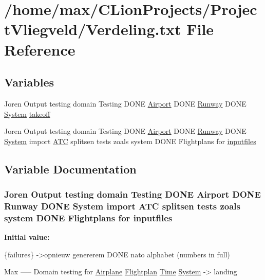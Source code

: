 \hypertarget{Verdeling_8txt}{}\section{/home/max/\+C\+Lion\+Projects/\+Project\+Vliegveld/\+Verdeling.txt File Reference}
\label{Verdeling_8txt}
\subsection*{Variables}
\begin{DoxyCompactItemize}
\item 
Joren Output testing domain Testing D\+O\+NE \hyperlink{classAirport}{Airport} D\+O\+NE \hyperlink{classRunway}{Runway} D\+O\+NE \hyperlink{classSystem}{System} \hyperlink{Verdeling_8txt_a79276dc93193eff1d7f9ab69fa134955}{takeoff}
\item 
Joren Output testing domain Testing D\+O\+NE \hyperlink{classAirport}{Airport} D\+O\+NE \hyperlink{classRunway}{Runway} D\+O\+NE \hyperlink{classSystem}{System} import \hyperlink{classATC}{A\+TC} splitsen tests zoals system D\+O\+NE Flightplans for \hyperlink{Verdeling_8txt_aed5addfe3e719c6d6cb3f85c69ea1b68}{inputfiles}
\end{DoxyCompactItemize}


\subsection{Variable Documentation}
\subsubsection[{\texorpdfstring{inputfiles}{inputfiles}}]{\setlength{\rightskip}{0pt plus 5cm}Joren Output testing domain Testing D\+O\+NE {\bf Airport} D\+O\+NE {\bf Runway} D\+O\+NE {\bf System} import {\bf A\+TC} splitsen tests zoals system D\+O\+NE Flightplans for inputfiles}\hypertarget{Verdeling_8txt_aed5addfe3e719c6d6cb3f85c69ea1b68}{}\label{Verdeling_8txt_aed5addfe3e719c6d6cb3f85c69ea1b68}
{\bfseries Initial value\+:}
\begin{DoxyCode}
\{failures\}
            ->opnieuw genererem
DONE    nato alphabet (numbers in full)


Max
-----
Domain testing \textcolor{keywordflow}{for}
\hyperlink{classAirplane}{Airplane}
\hyperlink{classFlightplan}{Flightplan}
\hyperlink{classTime}{Time}
\hyperlink{classSystem}{System} -> landing
\end{DoxyCode}
